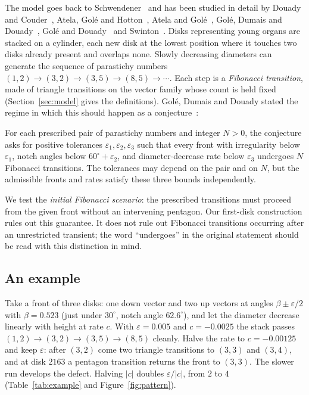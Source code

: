 \documentclass[11pt]{amsart}
\theoremstyle{definition}
\newcommand{\eps}{\varepsilon}
\begin{document}
The model goes back to Schwendener~\cite{Schwendener} and has been studied in detail by Douady and
Couder~\cite{DouadyCouder}, Atela, Gol\'e and Hotton~\cite{AGH}, Atela and
Gol\'e~\cite{AtelaGole}, Gol\'e, Dumais and Douady~\cite{GDD}, Gol\'e and Douady~\cite{GD} and
Swinton~\cite{Swinton2024}. Disks representing young organs are stacked on a cylinder, each new disk
at the lowest position where it touches two disks already present and overlaps none. Slowly decreasing diameters can generate the sequence of parastichy numbers
$(1,2)\to(3,2)\to(3,5)\to(8,5)\to\cdots$. Each step is a \emph{Fibonacci transition}, made of
triangle transitions on the vector family whose count is held fixed (Section~\ref{sec:model} gives the
definitions). Gol\'e, Dumais and Douady stated the regime in which this should happen as a
conjecture~\cite[p.~30]{GDD}:

For each prescribed pair of parastichy numbers and integer $N>0$, the conjecture asks for
positive tolerances $\eps_1,\eps_2,\eps_3$ such that every front with irregularity below $\eps_1$,
notch angles below $60^\circ+\eps_2$, and diameter-decrease rate below $\eps_3$ undergoes $N$
Fibonacci transitions. The tolerances may depend on the pair and on $N$, but the admissible
fronts and rates satisfy these three bounds independently.

We test the \emph{initial Fibonacci scenario}: the prescribed transitions must proceed from the
given front without an intervening pentagon. Our first-disk construction rules out this guarantee.
It does not rule out Fibonacci transitions occurring after an unrestricted transient; the word
``undergoes'' in the original statement should be read with this distinction in mind.

\subsection*{An example} Take a front of three disks: one down vector and two up vectors at angles
$\beta\pm\eps/2$ with $\beta=0.523$ (just under $30^\circ$, notch angle $62.6^\circ$), and let the
diameter decrease linearly with height at rate $c$. With $\eps=0.005$ and $c=-0.0025$ the stack
passes $(1,2)\to(3,2)\to(3,5)\to(8,5)$ cleanly. Halve the rate to $c=-0.00125$ and keep $\eps$: after
$(3,2)$ come two triangle transitions to $(3,3)$ and $(3,4)$, and at disk $2163$ a pentagon
transition returns the front to $(3,3)$. The slower run develops the defect. Halving $|c|$ doubles $\eps/|c|$, from $2$ to
$4$ (Table~\ref{tab:example} and Figure~\ref{fig:pattern}).
\end{document}
